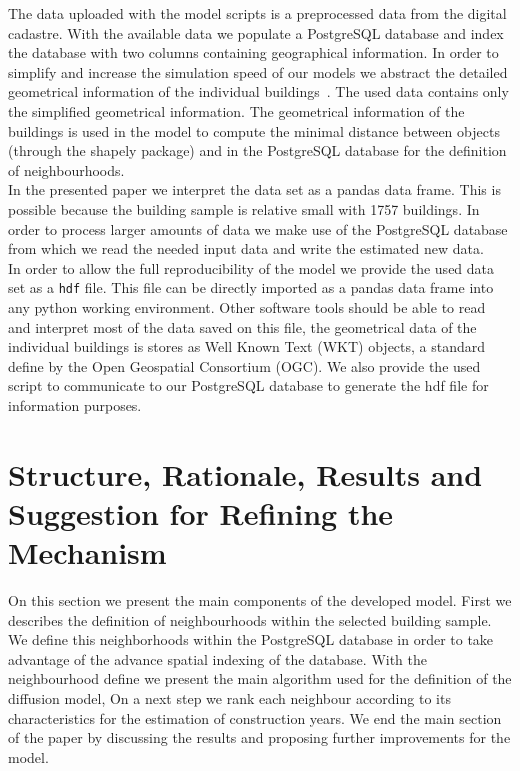 The data uploaded with the model scripts is a preprocessed data from the
digital cadastre. With the available data we populate a PostgreSQL database and
index the database with two columns containing geographical information. In
order to simplify and increase the simulation speed of our models we abstract
the detailed geometrical information of the individual
buildings~\citep{MunozH.2015.MEQ}. The used data contains only the simplified
geometrical information. The geometrical information of the buildings is used
in the model to compute the minimal distance between objects (through the
shapely package) and in the PostgreSQL database for the definition of
neighbourhoods.\\ 

In the presented paper we interpret the data set as a pandas data frame. This
is possible because the building sample is relative small with 1757 buildings.
In order to process larger amounts of data we make use of the PostgreSQL
database from which we read the needed input data and write the estimated new
data.\\

In order to allow the full reproducibility of the model we provide the used
data set as a \verb|hdf| file. This file can be directly imported as a pandas
data frame into any python working environment. Other software tools should be
able to read and interpret most of the data saved on this file, the
geometrical data of the individual buildings is stores as Well Known Text (WKT)
objects, a standard define by the Open Geospatial Consortium (OGC).
We also provide the used script to communicate to our PostgreSQL database to
generate the hdf file for information purposes.\\

\section{Structure, Rationale, Results and Suggestion for Refining the
Mechanism}

On this section we present the main components of the developed model. First we
describes the definition of neighbourhoods within the selected building sample.
We define this neighborhoods within the PostgreSQL database in order to take
advantage of the advance spatial indexing of the database. With the
neighbourhood define we present the main algorithm used for the definition of
the diffusion model, On a next step we rank each neighbour according to its
characteristics for the estimation of construction years. We end the main
section of the paper by discussing the results and proposing further
improvements for the model.\\ 

